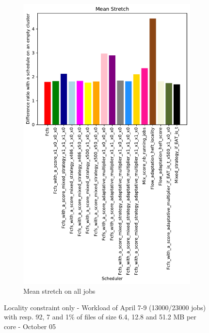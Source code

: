 \documentclass[a4paper]{article}
\begin{document}
\begin{figure}[H]
\begin{subfigure}[b]{0.4\linewidth}\centering\includegraphics[width=0.9\linewidth]{MBSS/plot/Results_FCFS_Score_Adaptative_Multiplier_2022-04-07->2022-04-09_V9271_Mean_Stretch_450_128_32_256_4_1024.pdf}\caption{Mean stretch on all jobs}\end{subfigure}
\caption{Locality constraint only - Workload of April 7-9 (13000/23000 jobs) with resp. 92, 7 and 1\% of files of size 6.4, 12.8 and 51.2 MB per core - October 05}\end{figure}
\end{document}
